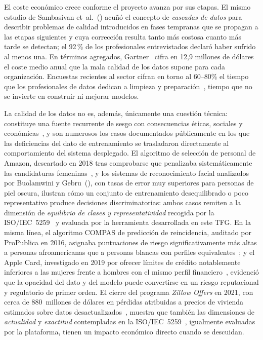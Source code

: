 El coste económico crece conforme el proyecto avanza por sus etapas. El mismo
estudio de Sambasivan et~al.~(\citeyear{sambasivan2021}) acuñó el concepto de
\emph{cascadas de datos} para describir problemas de calidad introducidos en
fases tempranas que se propagan a las etapas siguientes y cuya corrección resulta tanto
más costosa cuanto más tarde se detectan; el 92\,\% de los profesionales
entrevistados declaró haber sufrido al menos una. En términos agregados,
Gartner~\citep{gartner2021dq} cifra en 12,9 millones de dólares el coste medio
anual que la mala calidad de los datos supone para cada organización.
Encuestas recientes al sector cifran en torno
al 60--80\% el tiempo que los profesionales de datos dedican a limpieza y
preparación~\citep{kaggle2022}, tiempo que no se invierte en construir ni
mejorar modelos.

La calidad de los datos no es, además, únicamente una cuestión técnica:
constituye una fuente recurrente de sesgo con consecuencias éticas, sociales
y económicas~\citep{mehrabi2021, barocas2016}, y son numerosos los casos
documentados públicamente en los que las deficiencias del dato de
entrenamiento se trasladaron directamente al comportamiento del sistema
desplegado.  El algoritmo de selección de
personal de Amazon, descartado en 2018 tras comprobarse que penalizaba
sistemáticamente las candidaturas femeninas~\citep{amazon2018}, y los
sistemas de reconocimiento facial analizados por Buolamwini y
Gebru~(\citeyear{buolamwini2018}), con tasas de error muy superiores para
personas de piel oscura, ilustran cómo un conjunto de entrenamiento
desequilibrado o poco representativo produce decisiones discriminatorias:
ambos casos remiten a la dimensión de \emph{equilibrio de clases y
representatividad} recogida por la \ac{ISO}/\ac{IEC}~5259~\citep{iso5259} y
evaluada por la herramienta desarrollada en este \ac{TFG}.  En la misma
línea, el algoritmo COMPAS de predicción de reincidencia, auditado por
ProPublica en 2016, asignaba puntuaciones de riesgo significativamente más
altas a personas afroamericanas que a personas blancas con perfiles
equivalentes~\citep{compas2016}; y el Apple Card, investigado en 2019 por
ofrecer límites de crédito notablemente inferiores a las mujeres frente a
hombres con el mismo perfil financiero~\citep{applecard2019}, evidenció que
la opacidad del dato y del modelo puede convertirse en un riesgo
reputacional y regulatorio de primer orden.  El cierre del programa
\emph{Zillow Offers} en 2021, con cerca de 880~millones de dólares en
pérdidas atribuidas a precios de vivienda estimados sobre datos
desactualizados~\citep{zillow2021}, muestra que también las dimensiones de
\emph{actualidad} y \emph{exactitud} contempladas en la
\ac{ISO}/\ac{IEC}~5259~\citep{iso5259}, igualmente evaluadas por la plataforma,
tienen un impacto económico directo cuando se descuidan.

